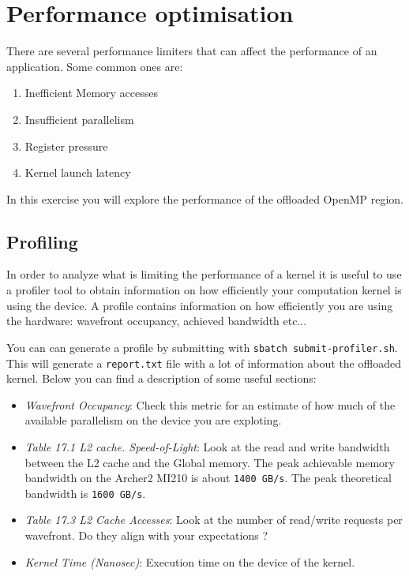 \documentclass{article}
\begin{document}
\section{Performance optimisation}

There are several performance limiters that can affect the performance of an application. Some common ones are:
\begin{enumerate}
    \item Inefficient Memory accesses
    \item Insufficient parallelism
    \item Register pressure
    \item Kernel launch latency
\end{enumerate}

In this exercise you will explore the performance of the offloaded OpenMP region.
\subsection{Profiling}
In order to analyze what is limiting the performance of a kernel it is useful to use a profiler tool to obtain information on how efficiently your computation kernel is using the device. A profile contains information on how efficiently you are using the hardware: wavefront occupancy, achieved bandwidth etc...

You can can generate a profile by submitting with \texttt{sbatch submit-profiler.sh}. This will generate a \texttt{report.txt} file with a lot of information about the offloaded kernel.
Below you can find a description of some useful sections:

\begin{itemize}
    \item \textit{Wavefront Occupancy}: Check this metric for an estimate of how much of the available parallelism on the device you are exploting.
    \item \textit{Table 17.1 L2 cache. Speed-of-Light}: Look at the read and write bandwidth between the L2 cache and the Global memory. The peak achievable memory bandwidth on the Archer2 MI210 is about \texttt{1400 GB/s}. The peak theoretical bandwidth is \texttt{1600 GB/s}.
    \item \textit{Table 17.3 L2 Cache Accesses}: Look at the number of read/write requests per wavefront. Do they align with your expectations ?
    \item \textit{Kernel Time (Nanosec)}: Execution time on the device of the kernel.
\end{itemize}
\end{document}

